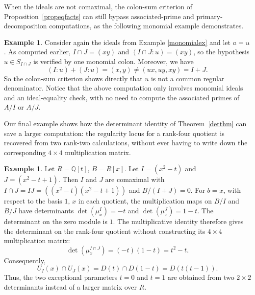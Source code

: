 \documentclass[11pt,leqno]{amsart}
\theoremstyle{definition}
\newtheorem{example}[theorem]{Example}
\numberwithin{equation}{section}
\begin{document}
When the ideals are not comaximal, the colon-sum criterion of Proposition~\ref{propeqfacts} can still bypass associated-prime and primary-decomposition computations, as the following monomial example demonstrates.

\begin{example}
Consider again the  ideals from Example \ref{monomialex} and let $a=u$. As computed earlier,
$
I\cap J=(xy)$ and $(I\cap J:u)=(xy)$,
so the hypothesis $u\in S_{I\cap J}$ is verified by one monomial colon. Moreover, we have
\[
(I:u)+(J:u)=(x,y)\ne(ux,uy,xy)=I+J.
\]
So the colon-sum criterion shows directly that $u$ is not a common regular denominator. Notice that the above computation only involves monomial ideals and an ideal-equality check, with no need to compute the associated primes of $A/I$ or $A/J$.
\end{example}

Our final example shows how the determinant identity of Theorem~\ref{detthm} can save a larger computation: the regularity locus for a rank-four quotient is recovered from two rank-two calculations, without ever having to write down the corresponding $4\times 4$ multiplication matrix.

\begin{example}
Let $R=\mathds{Q}[t]$, $B=R[x]$. Let
$
I=(x^2-t)$ and $J=(x^2-t+1).
$
Then $I$ and $J$ are comaximal with
$
I\cap J=IJ=((x^2-t)(x^2-t+1))$ and $B/(I+J)=0$.
For $b=x$,  with respect to the basis $1$, $x$ in each quotient, the multiplication maps on $B/I$ and $B/J$ have determinants
$
\det(\mu_x^I)=-t$ and
$\det(\mu_x^J)=1-t.
$
The determinant on the zero module is $1$. The multiplicative identity therefore gives the determinant on the rank-four quotient without constructing its $4\times4$ multiplication matrix:
\[
\det(\mu_x^{I\cap J})
=(-t)(1-t)=t^2-t.
\]
Consequently,
\[
U_I(x)\cap U_J(x)=D(t)\cap D(1-t)=D(t(t-1)).
\]
Thus, the two exceptional parameters $t=0$ and $t=1$ are obtained from two $2\times2$ determinants instead of a larger matrix over $R$.
\end{example}
\end{document}
